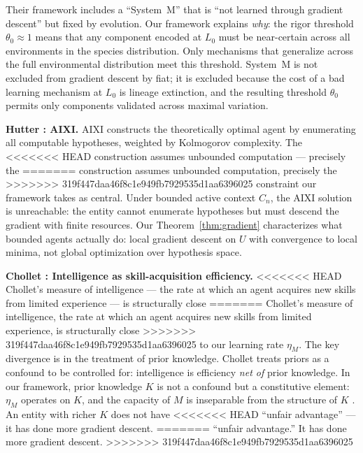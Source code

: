 \documentclass[11pt]{article}
\theoremstyle{definition}
\begin{document}
Their framework includes a ``System~M'' that is ``not learned through
gradient descent'' but fixed by evolution. Our framework explains
\emph{why}: the rigor threshold $\theta_0 \approx 1$ means that any
component encoded at $L_0$ must be near-certain across all
environments in the species distribution. Only mechanisms that
generalize across the full environmental distribution meet this
threshold. System~M is not excluded from gradient descent by fiat; it
is excluded because the cost of a bad learning mechanism at $L_0$ is
lineage extinction, and the resulting threshold $\theta_0$ permits
only components validated across maximal variation.

\textbf{Hutter \cite{Hutter2005}: AIXI.}
AIXI constructs the theoretically optimal agent by enumerating all
computable hypotheses, weighted by Kolmogorov complexity. The
<<<<<<< HEAD
construction assumes unbounded computation --- precisely the
=======
construction assumes unbounded computation, precisely the
>>>>>>> 319f447daa46f8c1e949fb7929535d1aa6396025
constraint our framework takes as central. Under bounded active
context $C_n$, the AIXI solution is unreachable: the entity cannot
enumerate hypotheses but must descend the gradient with finite
resources. Our Theorem~\ref{thm:gradient} characterizes what bounded
agents actually do: local gradient descent on $U$ with convergence to
local minima, not global optimization over hypothesis space.

\textbf{Chollet \cite{Chollet2019}: Intelligence as
skill-acquisition efficiency.}
<<<<<<< HEAD
Chollet's measure of intelligence --- the rate at which an agent
acquires new skills from limited experience --- is structurally close
=======
Chollet's measure of intelligence, the rate at which an agent
acquires new skills from limited experience, is structurally close
>>>>>>> 319f447daa46f8c1e949fb7929535d1aa6396025
to our learning rate $\eta_M$. The key divergence is in the treatment
of prior knowledge. Chollet treats priors as a confound to be
controlled for: intelligence is efficiency \emph{net of} prior
knowledge. In our framework, prior knowledge $K$ is not a confound
but a constitutive element: $\eta_M$ operates on $K$, and the
capacity of $M$ is inseparable from the structure of $K$
\cite{McCarthy2026c}. An entity with richer $K$ does not have
<<<<<<< HEAD
``unfair advantage'' --- it has done more gradient descent.
=======
``unfair advantage.'' It has done more gradient descent.
>>>>>>> 319f447daa46f8c1e949fb7929535d1aa6396025
\end{document}
